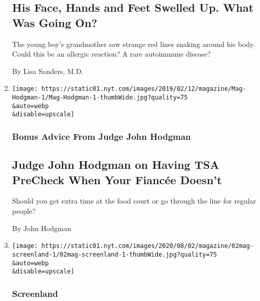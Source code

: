\begin{enumerate}
  \hypertarget{his-face-hands-and-feet-swelled-up-what-was-going-on}{%
  \subsection{His Face, Hands and Feet Swelled Up. What Was Going
  On?}\label{his-face-hands-and-feet-swelled-up-what-was-going-on}}

  The young boy's grandmother saw strange red lines snaking around his
  body. Could this be an allergic reaction? A rare autoimmune disease?

  By Lisa Sanders, M.D.
\item
  \href{/2020/07/30/magazine/judge-john-hodgman-on-having-tsa-precheck-when-your-fiancee-doesnt.html}{}

  \texttt{[image: https://static01.nyt.com/images/2019/02/12/magazine/Mag-Hodgman-1/Mag-Hodgman-1-thumbWide.jpg?quality=75\\\&auto=webp\\\&disable=upscale]}

  \hypertarget{bonus-advice-from-judge-john-hodgman}{%
  \subsubsection{Bonus Advice From Judge John
  Hodgman}\label{bonus-advice-from-judge-john-hodgman}}

  \hypertarget{judge-john-hodgman-on-having-tsa-precheck-when-your-fiancuxe9e-doesnt}{%
  \subsection{Judge John Hodgman on Having TSA PreCheck When Your
  Fiancée
  Doesn't}\label{judge-john-hodgman-on-having-tsa-precheck-when-your-fiancuxe9e-doesnt}}

  Should you get extra time at the food court or go through the line for
  regular people?

  By John Hodgman
\item
  \href{/2020/07/29/magazine/i-may-destroy-you-hbo-michaela-coel.html}{}

  \texttt{[image: https://static01.nyt.com/images/2020/08/02/magazine/02mag-screenland-1/02mag-screenland-1-thumbWide.jpg?quality=75\\\&auto=webp\\\&disable=upscale]}

  \hypertarget{screenland}{%
  \subsubsection{Screenland}\label{screenland}}


\end{enumerate}
